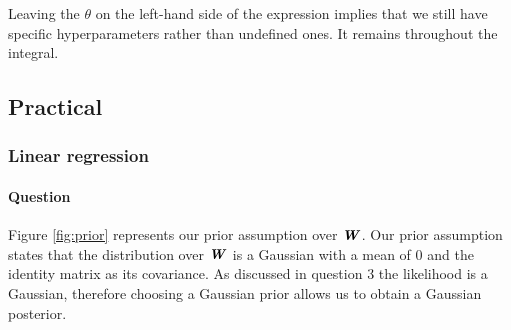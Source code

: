\documentclass{article}
\newcounter{question}
\newcommand{\question}{\stepcounter{question}\paragraph{Question \thequestion}}
\newcommand{\mat}[1]{\textbf{\textit{#1}}}
\begin{document}
Leaving the $\theta$ on the left-hand side of the expression implies that we still have specific hyperparameters rather than undefined ones. It remains throughout the integral.
\subsection{Practical}
\subsubsection{Linear regression}
\question Figure \ref{fig:prior} represents our prior assumption over $\mat{W}$. Our prior assumption states that the distribution over $\mat{W}$ is a Gaussian with a mean of $0$ and the identity matrix as its covariance. As discussed in question 3 the likelihood is a Gaussian, therefore choosing a Gaussian prior allows us to obtain a Gaussian posterior.
\end{document}
